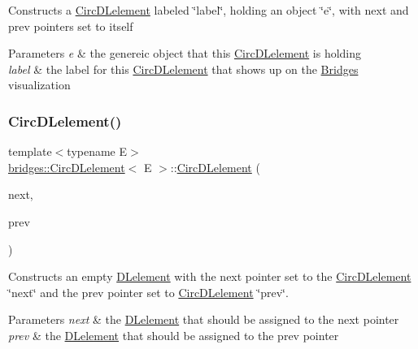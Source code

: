 Constructs a \hyperlink{classbridges_1_1_circ_d_lelement}{Circ\+D\+Lelement} labeled \char`\"{}label\char`\"{}, holding an object \char`\"{}e\char`\"{}, with next and prev pointers set to itself 
\begin{DoxyParams}{Parameters}
{\em e} & the genereic object that this \hyperlink{classbridges_1_1_circ_d_lelement}{Circ\+D\+Lelement} is holding \\
\hline
{\em label} & the label for this \hyperlink{classbridges_1_1_circ_d_lelement}{Circ\+D\+Lelement} that shows up on the \hyperlink{namespacebridges_1_1_bridges}{Bridges} visualization \\
\hline
\end{DoxyParams}
\hypertarget{classbridges_1_1_circ_d_lelement_a9d0cf8a5b60e3fedc1ba1ad792570934}{}\label{classbridges_1_1_circ_d_lelement_a9d0cf8a5b60e3fedc1ba1ad792570934} 
\subsubsection{\texorpdfstring{Circ\+D\+Lelement()}{CircDLelement()}\hspace{0.1cm}{\footnotesize\ttfamily [3/4]}}
{\footnotesize\ttfamily template$<$typename E$>$ \\
\hyperlink{classbridges_1_1_circ_d_lelement}{bridges\+::\+Circ\+D\+Lelement}$<$ E $>$\+::\hyperlink{classbridges_1_1_circ_d_lelement}{Circ\+D\+Lelement} (\begin{DoxyParamCaption}\item[{\hyperlink{classbridges_1_1_circ_d_lelement}{Circ\+D\+Lelement}$<$ E $>$}]{next,  }\item[{\hyperlink{classbridges_1_1_circ_d_lelement}{Circ\+D\+Lelement}$<$ E $>$}]{prev }\end{DoxyParamCaption})\hspace{0.3cm}{\ttfamily [inline]}}

Constructs an empty \hyperlink{classbridges_1_1_d_lelement}{D\+Lelement} with the next pointer set to the \hyperlink{classbridges_1_1_circ_d_lelement}{Circ\+D\+Lelement} \char`\"{}next\char`\"{} and the prev pointer set to \hyperlink{classbridges_1_1_circ_d_lelement}{Circ\+D\+Lelement} \char`\"{}prev\char`\"{}.


\begin{DoxyParams}{Parameters}
{\em next} & the \hyperlink{classbridges_1_1_d_lelement}{D\+Lelement} that should be assigned to the next pointer \\
\hline
{\em prev} & the \hyperlink{classbridges_1_1_d_lelement}{D\+Lelement} that should be assigned to the prev pointer \\
\hline
\end{DoxyParams}
\hypertarget{classbridges_1_1_circ_d_lelement_a2e729cd481f11c51bb5b686b8072ec8c}{}\label{classbridges_1_1_circ_d_lelement_a2e729cd481f11c51bb5b686b8072ec8c} 
